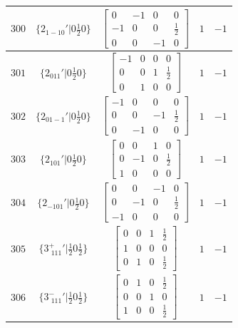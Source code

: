 \documentclass[fleqn,8pt]{jsarticle}
\begin{document}
\begin{longtable}{ccccc}
$ 300 $ & $ \{2{}_{1-10}{}'|0 \frac{1}{2} 0\} $ & $ \begin{bmatrix} 0 & -1 & 0 & 0 \\ -1 & 0 & 0 & \frac{1}{2} \\ 0 & 0 & -1 & 0 \end{bmatrix} $ & $ 1 $ & $ -1 $ \\ \hline
$ 301 $ & $ \{2{}_{011}{}'|0 \frac{1}{2} 0\} $ & $ \begin{bmatrix} -1 & 0 & 0 & 0 \\ 0 & 0 & 1 & \frac{1}{2} \\ 0 & 1 & 0 & 0 \end{bmatrix} $ & $ 1 $ & $ -1 $ \\ \hline
$ 302 $ & $ \{2{}_{01-1}{}'|0 \frac{1}{2} 0\} $ & $ \begin{bmatrix} -1 & 0 & 0 & 0 \\ 0 & 0 & -1 & \frac{1}{2} \\ 0 & -1 & 0 & 0 \end{bmatrix} $ & $ 1 $ & $ -1 $ \\ \hline
$ 303 $ & $ \{2{}_{101}{}'|0 \frac{1}{2} 0\} $ & $ \begin{bmatrix} 0 & 0 & 1 & 0 \\ 0 & -1 & 0 & \frac{1}{2} \\ 1 & 0 & 0 & 0 \end{bmatrix} $ & $ 1 $ & $ -1 $ \\ \hline
$ 304 $ & $ \{2{}_{-101}{}'|0 \frac{1}{2} 0\} $ & $ \begin{bmatrix} 0 & 0 & -1 & 0 \\ 0 & -1 & 0 & \frac{1}{2} \\ -1 & 0 & 0 & 0 \end{bmatrix} $ & $ 1 $ & $ -1 $ \\ \hline
$ 305 $ & $ \{3^{+}_{\,\,111}{}'|\frac{1}{2} 0 \frac{1}{2}\} $ & $ \begin{bmatrix} 0 & 0 & 1 & \frac{1}{2} \\ 1 & 0 & 0 & 0 \\ 0 & 1 & 0 & \frac{1}{2} \end{bmatrix} $ & $ 1 $ & $ -1 $ \\ \hline
$ 306 $ & $ \{3^{-}_{\,\,111}{}'|\frac{1}{2} 0 \frac{1}{2}\} $ & $ \begin{bmatrix} 0 & 1 & 0 & \frac{1}{2} \\ 0 & 0 & 1 & 0 \\ 1 & 0 & 0 & \frac{1}{2} \end{bmatrix} $ & $ 1 $ & $ -1 $ \\ \hline

\end{longtable}
\end{document}
